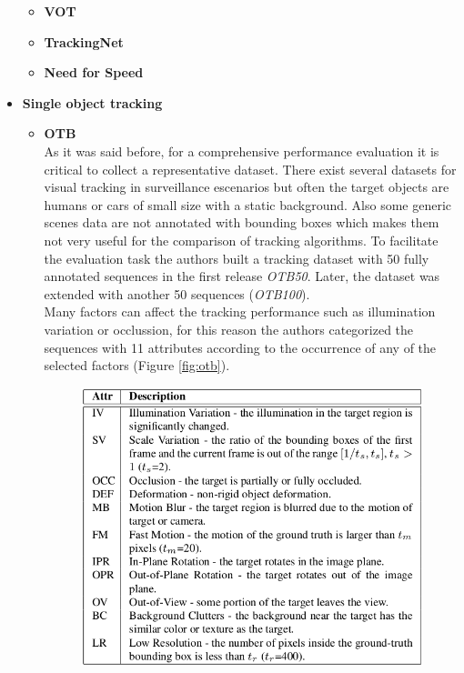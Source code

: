 \documentclass{bmvc2k}
\begin{document}
\begin{itemize}
\begin{itemize}
\item \textbf{VOT}
\item \textbf{TrackingNet}
\item \textbf{Need for Speed}
\end{itemize}
\item \textbf{Single object tracking}
\begin{itemize}
\item \textbf{OTB} ~\cite{wu2013online}\\
As it was said before, for a comprehensive performance evaluation it is critical to collect a representative dataset. There exist several datasets for visual tracking in surveillance escenarios but often the target objects are humans or cars of small size with a static background. Also some generic scenes data are not annotated with bounding boxes which makes them not very useful for the comparison of tracking algorithms. To facilitate the evaluation task the authors built a tracking dataset with 50 fully annotated sequences in the first release \textit{OTB50}. Later, the dataset was extended with another 50 sequences (\textit{OTB100}).\\ Many factors can affect the tracking performance such as illumination variation or occlussion, for this reason the authors categorized the sequences with 11 attributes according to the occurrence of any of the selected factors (Figure \ref{fig:otb}).\\
\begin{figure}[h!]
\begin{center}
\includegraphics[scale=0.3]{otb_attributes.png}

\end{center}
\end{figure}
\end{itemize}
\end{itemize}
\end{document}
